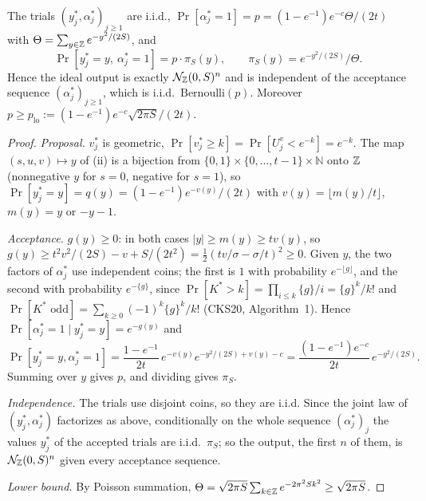 \begin{lemma}\label{lem:idealsampler}
The trials $(y^*_j,\alpha^*_j)_{j\ge1}$ are i.i.d., $\Pr[\alpha^*_j=1]=p=(1-e^{-1})e^{-c}\Theta/(2t)$ with $\Theta=\sum_{y\in\mathbb{Z}}e^{-y^2/(2S)}$, and
\[
  \Pr[y^*_j=y,\ \alpha^*_j=1]=p\cdot\pi_S(y),\qquad \pi_S(y)=e^{-y^2/(2S)}/\Theta .
\]
Hence the ideal output is exactly $\mathcal{N}_{\mathbb{Z}}(0,S)^n$ and is independent of the acceptance sequence $(\alpha^*_j)_{j\ge1}$, which is i.i.d.\ $\mathrm{Bernoulli}(p)$. Moreover $p\ge p_{\mathrm{lo}}:=(1-e^{-1})e^{-c}\sqrt{2\pi S}/(2t)$.
\end{lemma}
\begin{proof}
\emph{Proposal.} $v^*_j$ is geometric, $\Pr[v^*_j\ge k]=\Pr[U^v_j<e^{-k}]=e^{-k}$. The map $(s,u,v)\mapsto y$ of (ii) is a bijection from $\{0,1\}\times\{0,\dots,t-1\}\times\mathbb{N}$ onto $\mathbb{Z}$ (nonnegative $y$ for $s=0$, negative for $s=1$), so $\Pr[y^*_j=y]=q(y)=(1-e^{-1})e^{-v(y)}/(2t)$ with $v(y)=\lfloor m(y)/t\rfloor$, $m(y)=y$ or $-y-1$.

\emph{Acceptance.} $g(y)\ge0$: in both cases $|y|\ge m(y)\ge tv(y)$, so $g(y)\ge t^2v^2/(2S)-v+S/(2t^2)=\tfrac12(tv/\sigma-\sigma/t)^2\ge0$. Given $y$, the two factors of $\alpha^*_j$ use independent coins; the first is $1$ with probability $e^{-\lfloor g\rfloor}$, and the second with probability $e^{-\{g\}}$, since $\Pr[K^*>k]=\prod_{i\le k}\{g\}/i=\{g\}^k/k!$ and $\Pr[K^*\text{ odd}]=\sum_{k\ge0}(-1)^k\{g\}^k/k!$ (CKS20, Algorithm~1). Hence $\Pr[\alpha^*_j=1\mid y^*_j=y]=e^{-g(y)}$ and
\[
  \Pr[y^*_j=y,\alpha^*_j=1]=\frac{1-e^{-1}}{2t}\,e^{-v(y)}e^{-y^2/(2S)+v(y)-c}=\frac{(1-e^{-1})e^{-c}}{2t}\,e^{-y^2/(2S)} .
\]
Summing over $y$ gives $p$, and dividing gives $\pi_S$.

\emph{Independence.} The trials use disjoint coins, so they are i.i.d. Since the joint law of $(y^*_j,\alpha^*_j)$ factorizes as above, conditionally on the whole sequence $(\alpha^*_j)_j$ the values $y^*_j$ of the accepted trials are i.i.d.\ $\pi_S$; so the output, the first $n$ of them, is $\mathcal{N}_{\mathbb{Z}}(0,S)^n$ given every acceptance sequence.

\emph{Lower bound.} By Poisson summation, $\Theta=\sqrt{2\pi S}\sum_{k\in\mathbb{Z}}e^{-2\pi^2Sk^2}\ge\sqrt{2\pi S}$.
\end{proof}

